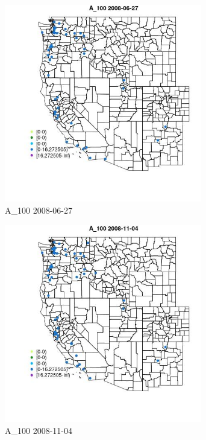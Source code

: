 \begin{figure} 
\centering  
\includegraphics[width=0.77\textwidth]{Code_Outputs/Report_ML_input_PM25_Step4_part_e_de_duplicated_aves_MapObsA_1002008-06-27.jpg} 
\caption{\label{fig:Report_ML_input_PM25_Step4_part_e_de_duplicated_avesMapObsA_1002008-06-27}A_100 2008-06-27} 
\end{figure} 
 

\clearpage 

\begin{figure} 
\centering  
\includegraphics[width=0.77\textwidth]{Code_Outputs/Report_ML_input_PM25_Step4_part_e_de_duplicated_aves_MapObsA_1002008-11-04.jpg} 
\caption{\label{fig:Report_ML_input_PM25_Step4_part_e_de_duplicated_avesMapObsA_1002008-11-04}A_100 2008-11-04} 
\end{figure} 
 

